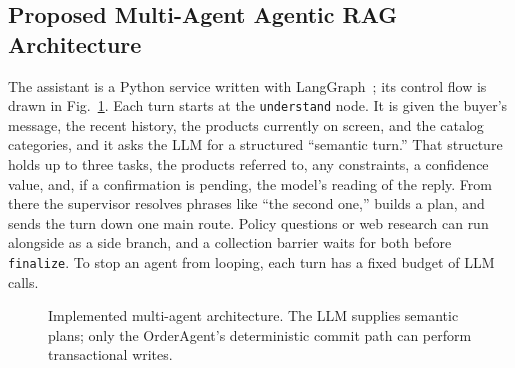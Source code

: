 \documentclass{IEEEtran}
\newcommand{\code}[1]{\texttt{\small #1}}
\begin{document}
\subsection{Proposed Multi-Agent Agentic RAG Architecture}

The assistant is a Python service written with LangGraph~\cite{langgraph}; its control flow is drawn in Fig.~\ref{fig:architecture}. Each turn starts at the \code{understand} node. It is given the buyer's message, the recent history, the products currently on screen, and the catalog categories, and it asks the LLM for a structured ``semantic turn.'' That structure holds up to three tasks, the products referred to, any constraints, a confidence value, and, if a confirmation is pending, the model's reading of the reply. From there the supervisor resolves phrases like ``the second one,'' builds a plan, and sends the turn down one main route. Policy questions or web research can run alongside as a side branch, and a collection barrier waits for both before \code{finalize}. To stop an agent from looping, each turn has a fixed budget of LLM calls.

\begin{figure}[t]
\centering
{}
\caption{Implemented multi-agent architecture. The LLM supplies semantic plans; only the OrderAgent's deterministic commit path can perform transactional writes.}
\label{fig:architecture}
\end{figure}
\end{document}
